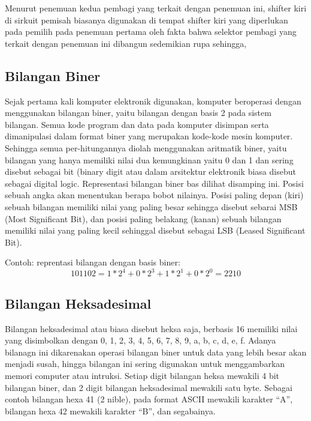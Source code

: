 Menurut penemuan kedua pembagi yang terkait dengan penemuan ini, shifter kiri di sirkuit pemisah biasanya digunakan di tempat shifter kiri yang diperlukan pada pemilih pada penemuan pertama oleh fakta bahwa selektor pembagi yang terkait dengan penemuan ini dibangun sedemikian rupa sehingga, 

\subsection{Bilangan Biner}
Sejak pertama kali komputer elektronik digunakan, komputer beroperasi dengan menggunakan bilangan biner, yaitu bilangan dengan basis 2 pada sistem bilangan. Semua kode program dan data pada komputer disimpan serta dimanipulasi dalam format biner yang merupakan kode-kode mesin komputer. Sehingga semua per-hitungannya diolah menggunakan aritmatik biner, yaitu bilangan yang hanya memiliki nilai dua kemungkinan yaitu 0 dan 1 dan sering disebut sebagai bit (binary digit atau dalam arsitektur elektronik biasa disebut sebagai digital logic. Representasi bilangan biner bas dilihat disamping ini. Posisi sebuah angka akan menentukan berapa bobot nilainya. Posisi paling depan (kiri) sebuah bilangan memiliki nilai yang paling besar sehingga disebut sebarai MSB (Most Significant Bit), dan posisi paling belakang (kanan) sebuah bilangan memiliki nilai yang paling kecil sehinggal disebut sebagai LSB (Leased Significant Bit).

Contoh: reprentasi bilangan dengan basis biner:
\begin{equation}
101102 = 1*2^4 + 0*2^3+1*2^1+0*2^0=2210
\end{equation}

\subsection{Bilangan Heksadesimal}
Bilangan heksadesimal atau biasa disebut heksa saja, berbasis 16 memiliki nilai yang disimbolkan dengan 0, 1, 2, 3, 4, 5, 6, 7, 8, 9, a, b, c, d, e, f. Adanya bilanagn ini dikarenakan operasi bilangan biner untuk data yang lebih besar akan menjadi susah, hingga bilangan ini sering digunakan untuk menggambarkan memori computer atau intruksi. Setiap digit bilangan heksa mewakili 4 bit bilangan biner, dan 2 digit bilangan heksadesimal mewakili satu byte.
Sebagai contoh bilangan hexa 41 (2 nible), pada format ASCII mewakili karakter “A”, bilangan hexa 42 mewakili karakter “B”, dan segabainya.
